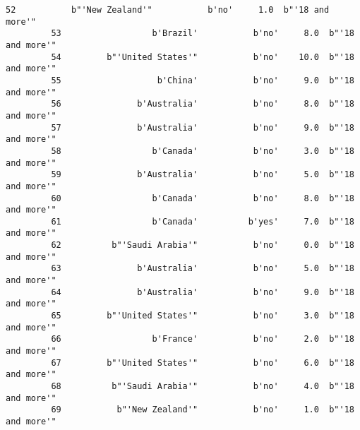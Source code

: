 \documentclass[11pt]{article}
\begin{document}
\begin{Verbatim}[commandchars=\\\{\}]
         52           b"'New Zealand'"           b'no'     1.0  b"'18 and more'"   
         53                  b'Brazil'           b'no'     8.0  b"'18 and more'"   
         54         b"'United States'"           b'no'    10.0  b"'18 and more'"   
         55                   b'China'           b'no'     9.0  b"'18 and more'"   
         56               b'Australia'           b'no'     8.0  b"'18 and more'"   
         57               b'Australia'           b'no'     9.0  b"'18 and more'"   
         58                  b'Canada'           b'no'     3.0  b"'18 and more'"   
         59               b'Australia'           b'no'     5.0  b"'18 and more'"   
         60                  b'Canada'           b'no'     8.0  b"'18 and more'"   
         61                  b'Canada'          b'yes'     7.0  b"'18 and more'"   
         62          b"'Saudi Arabia'"           b'no'     0.0  b"'18 and more'"   
         63               b'Australia'           b'no'     5.0  b"'18 and more'"   
         64               b'Australia'           b'no'     9.0  b"'18 and more'"   
         65         b"'United States'"           b'no'     3.0  b"'18 and more'"   
         66                  b'France'           b'no'     2.0  b"'18 and more'"   
         67         b"'United States'"           b'no'     6.0  b"'18 and more'"   
         68          b"'Saudi Arabia'"           b'no'     4.0  b"'18 and more'"   
         69           b"'New Zealand'"           b'no'     1.0  b"'18 and more'"   
         

\end{Verbatim}
\end{document}
